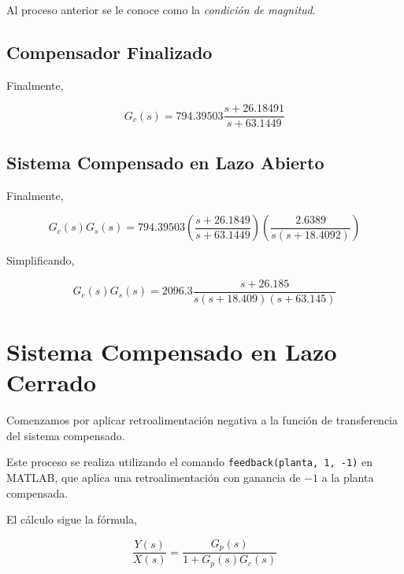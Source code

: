 \documentclass[12pt,a4paper]{article}
\begin{document}
          Al proceso anterior se le conoce como la \emph{condición de magnitud}. 

      \subsection{Compensador Finalizado}

        Finalmente, 

        \begin{equation} 
          G_{c}\left(s\right) = 794.39503\dfrac{s + 26.18491}{s + 63.1449}
        \end{equation}

      \subsection{Sistema Compensado en Lazo Abierto}

        Finalmente, 

        \begin{equation}
          G_{c}\left(s\right)G_{s}\left(s\right) =  794.39503 \left(\dfrac{s + 26.1849}{s + 63.1449}\right)\left(\dfrac{2.6389}{s\left(s + 18.4092\right)}\right) 
          \label{eq:design:OpenLoop_compensated_tf}
        \end{equation}

        Simplificando, 

        \begin{equation}
          G_{c}\left(s\right)G_{s}\left(s\right) = 2096.3 \dfrac{s + 26.185}{s \left( s + 18.409 \right) \left(s + 63.145\right)}
          \label{eq:design:OpenLoop_compensated_tf_final}
        \end{equation}

  \pagebreak

  \section{Sistema Compensado en Lazo Cerrado}
      
    Comenzamos por aplicar retroalimentación negativa a la función de transferencia del sistema compensado. 

    Este proceso se realiza utilizando el comando \verb|feedback(planta, 1, -1)| en MATLAB, que aplica 
    una retroalimentación con ganancia de \( -1 \) a la planta compensada. 

    El cálculo sigue la fórmula,

    \begin{equation}
      \dfrac{Y\left(s\right)}{X\left(s\right)} = \dfrac{G_{p}\left(s\right)}{1 + G_{p}\left(s\right) G_{c}\left(s\right)}
      \label{eq:}
    \end{equation}
    
\end{document}
